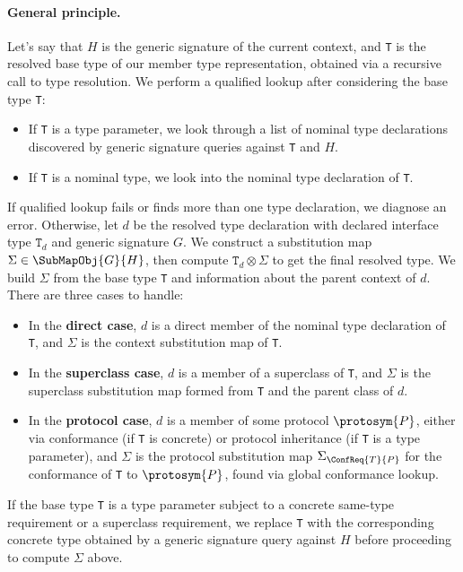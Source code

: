 \documentclass[../generics]{subfiles}
\begin{document}
\paragraph{General principle.} Let's say that $H$ is the generic signature of the current context, and \texttt{T} is the resolved base type of our member type representation, obtained via a recursive call to type resolution. We perform a qualified lookup after considering the base type \texttt{T}:
\begin{itemize}
\item If \texttt{T} is a type parameter, we look through a list of nominal type declarations discovered by generic signature queries against \texttt{T} and $H$.
\item If \texttt{T} is a nominal type, we look into the nominal type declaration of \texttt{T}.
\end{itemize}
If qualified lookup fails or finds more than one type declaration, we diagnose an error. Otherwise, let $d$ be the resolved type declaration with declared interface type $\texttt{T}_d$ and generic signature $G$. We construct a substitution map $\Sigma\in\SubMapObj{G}{H}$, then compute $\texttt{T}_d\otimes\Sigma$ to get the final resolved type. We build $\Sigma$ from the base type \texttt{T} and information about the parent context of $d$. There are three cases to handle:
\begin{itemize}
\item In the \textbf{direct case}, $d$ is a direct member of the nominal type declaration of \texttt{T}, and $\Sigma$ is the context substitution map of \texttt{T}.
\item In the \textbf{superclass case}, $d$ is a member of a superclass of \texttt{T}, and $\Sigma$ is the superclass substitution map formed from \texttt{T} and the parent class of $d$.
\item In the \textbf{protocol case}, $d$ is a member of some protocol $\protosym{P}$, either via conformance (if \texttt{T} is concrete) or protocol inheritance (if \texttt{T} is a type parameter), and $\Sigma$ is the protocol substitution map $\Sigma_{\ConfReq{T}{P}}$ for the conformance of \texttt{T} to $\protosym{P}$, found via global conformance lookup.
\end{itemize}
If the base type \texttt{T} is a type parameter subject to a concrete same-type requirement or a superclass requirement, we replace \texttt{T} with the corresponding concrete type obtained by a generic signature query against $H$ before proceeding to compute $\Sigma$ above.
\end{document}
